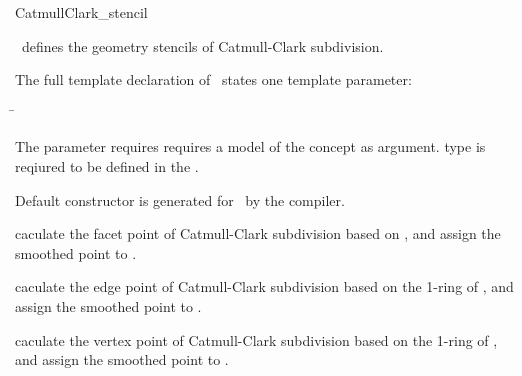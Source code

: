 \ccRefPageEnd



\begin{ccRefClass}{CatmullClark_stencil}

\ccDefinition

\ccClassTemplateName\ defines the 
geometry stencils of Catmull-Clark subdivision. 


\ccParameters

The full template declaration of \ccClassTemplateName\ states one
template parameter:

\begin{tabbing}
 \=\\
\end{tabbing}
   
The  parameter requires requires a model of 
the  concept as argument.  
type is reqiured to be defined in the .

\ccCreation

Default constructor is generated for \ccClassTemplateName\ by the compiler.

\ccThree{}{}{}

{caculate the facet point of Catmull-Clark subdivision based on , 
and assign the smoothed point to .}

{caculate the edge point of Catmull-Clark subdivision based on the 1-ring
of , and assign the smoothed point to .}

{caculate the vertex point of Catmull-Clark subdivision based on the 
1-ring of , and assign the smoothed point to .}


\ccSeeAlso

\\

\end{ccRefClass}

